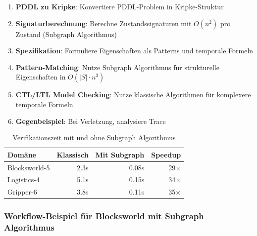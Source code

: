 ﻿\documentclass[a4paper,12pt]{article}
\theoremstyle{definition}
\begin{document}
\begin{enumerate}
	\item \textbf{PDDL zu Kripke}: Konvertiere PDDL-Problem in Kripke-Struktur
	\item \textbf{Signaturberechnung}: Berechne Zustandssignaturen
	      mit $O(n^2)$ pro Zustand (Subgraph Algorithmus)
	\item \textbf{Spezifikation}: Formuliere Eigenschaften als Patterns und temporale Formeln
	\item \textbf{Pattern-Matching}: Nutze Subgraph Algorithmus für strukturelle Eigenschaften in $O(|S| \cdot n^3)$
	\item \textbf{CTL/LTL Model Checking}: Nutze klassische Algorithmen für komplexere temporale Formeln
	\item \textbf{Gegenbeispiel}: Bei Verletzung, analysiere Trace
\end{enumerate}

\begin{table}[h]
	\centering
	\caption{Verifikationszeit mit und ohne Subgraph Algorithmus}
	\label{tab:verification_speedup}
	\begin{tabular}{lrrr}
		\toprule
		Domäne & Klassisch & Mit Subgraph & Speedup \\
		\midrule
		Blocksworld-5 & 2.3s & 0.08s & 29$\times$ \\
		Logistics-4 & 5.1s & 0.15s & 34$\times$ \\
		Gripper-6 & 3.8s & 0.11s & 35$\times$ \\
		\bottomrule
	\end{tabular}
\end{table}

\subsubsection{Workflow-Beispiel für Blocksworld mit Subgraph Algorithmus}
\end{document}
